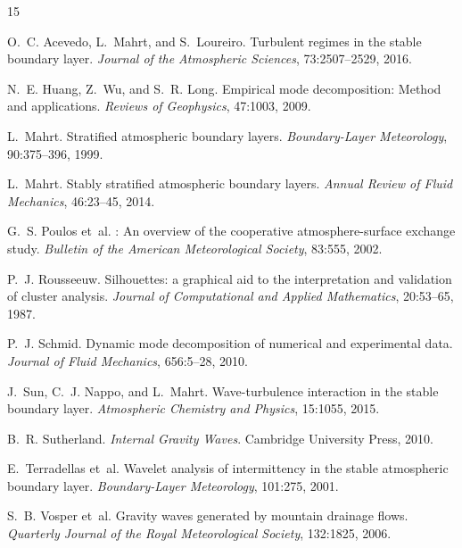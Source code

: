 \documentclass[11pt,a4paper]{article}
\begin{document}

\begin{thebibliography}{15}
\providecommand{\natexlab}[1]{#1}

O.~C. Acevedo, L.~Mahrt, and S.~Loureiro.
\newblock Turbulent regimes in the stable boundary layer.
\newblock \emph{Journal of the Atmospheric Sciences}, 73:2507--2529, 2016.

N.~E. Huang, Z.~Wu, and S.~R. Long.
\newblock Empirical mode decomposition: Method and applications.
\newblock \emph{Reviews of Geophysics}, 47:\num{1003}, 2009.

L.~Mahrt.
\newblock Stratified atmospheric boundary layers.
\newblock \emph{Boundary-Layer Meteorology}, 90:\num{375}--\num{396}, 1999.

L.~Mahrt.
\newblock Stably stratified atmospheric boundary layers.
\newblock \emph{Annual Review of Fluid Mechanics}, 46:\num{23}--\num{45}, 2014.

G.~S. Poulos et~al.
: An overview of the cooperative atmosphere-surface exchange study.
\newblock \emph{Bulletin of the American Meteorological Society}, 83:\num{555}, 2002.

P.~J. Rousseeuw.
\newblock Silhouettes: a graphical aid to the interpretation and validation of cluster analysis.
\newblock \emph{Journal of Computational and Applied Mathematics}, 20:\num{53}--\num{65}, 1987.

P.~J. Schmid.
\newblock Dynamic mode decomposition of numerical and experimental data.
\newblock \emph{Journal of Fluid Mechanics}, 656:\num{5}--\num{28}, 2010.

J.~Sun, C.~J. Nappo, and L.~Mahrt.
\newblock Wave-turbulence interaction in the stable boundary layer.
\newblock \emph{Atmospheric Chemistry and Physics}, 15:\num{1055}, 2015.

B.~R. Sutherland.
\newblock \emph{Internal Gravity Waves}.
\newblock Cambridge University Press, 2010.

E.~Terradellas et~al.
\newblock Wavelet analysis of intermittency in the stable atmospheric boundary layer.
\newblock \emph{Boundary-Layer Meteorology}, 101:\num{275}, 2001.

S.~B. Vosper et~al.
\newblock Gravity waves generated by mountain drainage flows.
\newblock \emph{Quarterly Journal of the Royal Meteorological Society}, 132:\num{1825}, 2006.

\end{thebibliography}
\end{document}

